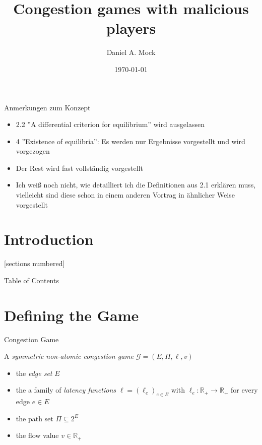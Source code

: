 \documentclass{beamer}
\title{Congestion games with malicious players}
\date{\today}
\author{Daniel A. Mock}
\institute{Lehrstuhl i1 -- RWTH Aachen}
\begin{document}
\begin{frame}{Anmerkungen zum Konzept}
	\begin{itemize}
		\item 2.2 ''A differential criterion for equilibrium'' wird ausgelassen
		\item 4 ''Existence of equilibria'': Es werden nur Ergebnisse vorgestellt und wird vorgezogen
		\item Der Rest wird fast vollständig vorgestellt
		\item Ich weiß noch nicht, wie detailliert ich die Definitionen aus 2.1 erklären muss, vielleicht sind diese schon in einem anderen Vortrag in ähnlicher Weise vorgestellt
	\end{itemize}
\end{frame}

\maketitle

\section{Introduction}

[sections numbered]

\begin{frame}{Table of Contents}
	\tableofcontents
\end{frame}


\section{Defining the Game}

\begin{frame}{Congestion Game}
	
	\begin{definition}
		A \emph{symmetric non-atomic congestion game} $\mathcal{G} = (E, \Pi, \ell, v)$
	\end{definition}

	\begin{itemize}
		\item the \emph{edge set} $E$
		\item the a family of \emph{latency functions} $\ell = (\ell_e)_{e \in E}$ with 
		 $\ell_e: \mathbb{R}_+ \to \mathbb{R}_+$ for every edge $e \in E$
		\item the path set $\Pi \subseteq 2^E$
		\item the flow value $v \in \mathbb{R}_+$
	\end{itemize}
\end{frame}
\end{document}
